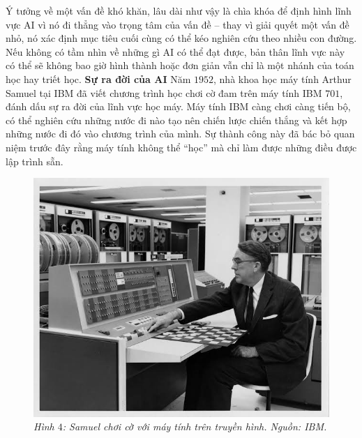 \begin{multicols}{2}
	\vskip 0.1cm
	Ý tưởng về một vấn đề khó khăn, lâu dài như vậy là chìa khóa để định hình lĩnh vực AI vì nó đi thẳng vào trọng tâm của vấn đề -- thay vì giải quyết một vấn đề nhỏ, nó xác định mục tiêu cuối cùng có thể kéo nghiên cứu theo nhiều con đường. Nếu không có tầm nhìn về những gì AI có thể đạt được, bản thân lĩnh vực này có thể sẽ không bao giờ hình thành hoặc đơn giản vẫn chỉ là một nhánh của toán học hay triết học. 
	\vskip 0.1cm
	\textbf{\color{timhieukhoahoc}Sự ra đời của AI}
	\vskip 0.1cm
	Năm $1952$, nhà khoa học máy tính Arthur Samuel tại IBM đã viết chương trình học chơi cờ đam trên máy tính IBM $701$, đánh dấu sự ra đời của lĩnh vực học máy. Máy tính IBM càng chơi càng tiến bộ, có thể nghiên cứu những nước đi nào tạo nên chiến lược chiến thắng và kết hợp những nước đi đó vào chương trình của mình. Sự thành công này đã bác bỏ quan niệm trước đây rằng máy tính không thể “học” mà chỉ làm được những điều được lập trình sẵn.
	\begin{figure}[H]
		\vspace*{-5pt}
		\centering
		\captionsetup{labelformat= empty, justification=centering}
		\includegraphics[width= 1\linewidth]{Samuel_Checker.jpeg}
		\caption{\small\textit{\color{timhieukhoahoc}Hình $4$: Samuel chơi cờ với máy tính trên truyền hình. Nguồn: IBM.}}
		\vspace*{-10pt}
	\end{figure}

\end{multicols}

